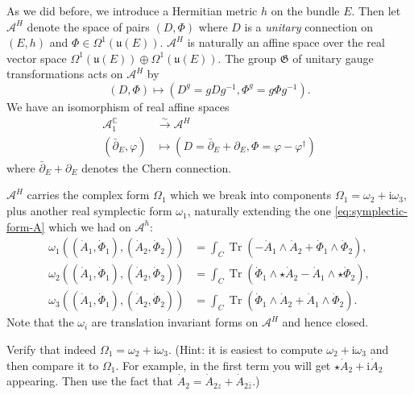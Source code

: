 \documentclass[12pt,letterpaper,reqno]{article}
\numberwithin{equation}{section}
\newcommand{\fu}{{\mathfrak u}}
\newcommand{\fG}{{\mathfrak G}}
\newcommand{\cA}{\ensuremath{\mathcal A}}
\newcommand{\C}{\ensuremath{\mathbb C}}
\newcommand{\I}{{\mathrm i}}
\newcommand{\simarrow}{\xrightarrow\sim}
\newcommand{\ti}[1]{\textit{#1}}
\DeclareMathOperator{\Tr}{Tr}
\begin{document}
As we did before, we introduce a Hermitian metric $h$ on the 
bundle $E$.
Then let $\cA^H$ denote the space
of pairs $(D,\Phi)$ where $D$ is a \ti{unitary} connection on $(E,h)$
and $\Phi \in \Omega^1(\fu(E))$.
$\cA^H$ is naturally an affine space over the real vector space
$\Omega^1(\fu(E)) \oplus \Omega^1(\fu(E))$.
The group $\fG$ of unitary gauge transformations
acts on $\cA^H$ by
\begin{equation}
  (D,\Phi) \mapsto (D^g = g D g^{-1}, \Phi^g = g \Phi g^{-1}).
\end{equation}
We have an isomorphism of real affine spaces
\begin{align}
    \cA^\C_1 &\simarrow \cA^H \\
    (\bar\partial_E,\varphi) & \mapsto (D = \bar\partial_E + \partial_E, \Phi = \varphi - \varphi^\dagger)
\end{align}
where $\bar\partial_E + \partial_E$ denotes the Chern connection.

$\cA^H$ carries the complex form $\Omega_1$ which we break into 
components $\Omega_1 = \omega_2 + \I \omega_3$, plus another 
real symplectic form $\omega_1$, naturally extending the one \eqref{eq:symplectic-form-A} which 
we had on $\cA^h$:
\begin{subequations} \label{eq:symplectic-forms-higgs}
\begin{align}
  \omega_1((\dot A_1, \dot \Phi_1),(\dot A_2, \dot \Phi_2)) &= \int_C \Tr(- \dot A_1 \wedge \dot A_2 + \dot \Phi_1 \wedge \dot \Phi_2), \\
  \omega_2((\dot A_1, \dot \Phi_1),(\dot A_2, \dot \Phi_2)) &= \int_C \Tr(\dot \Phi_1 \wedge \star \dot A_2 - \dot A_1 \wedge \star \dot \Phi_2), \\
  \omega_3((\dot A_1, \dot \Phi_1),(\dot A_2, \dot \Phi_2)) &= \int_C \Tr(\dot\Phi_1 \wedge \dot A_2 + \dot A_1 \wedge \dot \Phi_2).
\end{align}
\end{subequations}
Note that the $\omega_i$ are translation invariant forms on $\cA^H$ and hence
closed.

\begin{exercise} Verify that indeed $\Omega_1 = \omega_2 + \I \omega_3$. (Hint: it is
easiest to compute $\omega_2 + \I \omega_3$ and then compare it to $\Omega_1$.
For example, in the first term you will get $\star \dot{A}_2 + \I \dot{A}_2$ appearing.
Then use the fact that $\dot{A}_2 = \dot{A}_{2z} + \dot{A}_{2\bar{z}}$.)
\end{exercise}
\end{document}
